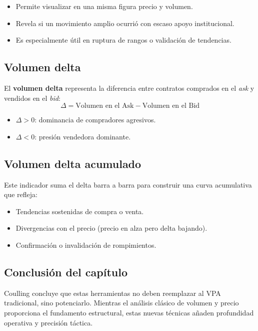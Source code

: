 \begin{itemize}
  \item Permite visualizar en una misma figura precio y volumen.
  \item Revela si un movimiento amplio ocurri\'o con escaso apoyo institucional.
  \item Es especialmente \'util en ruptura de rangos o validaci\'on de tendencias.
\end{itemize}

\subsection{Volumen delta}

El \textbf{volumen delta} representa la diferencia entre contratos comprados en el \textit{ask} y vendidos en el \textit{bid}:
\[ \Delta = \text{Volumen en el Ask} - \text{Volumen en el Bid} \]

\begin{itemize}
  \item $\Delta > 0$: dominancia de compradores agresivos.
  \item $\Delta < 0$: presi\'on vendedora dominante.
\end{itemize}

\subsection{Volumen delta acumulado}

Este indicador suma el delta barra a barra para construir una curva acumulativa que refleja:
\begin{itemize}
  \item Tendencias sostenidas de compra o venta.
  \item Divergencias con el precio (precio en alza pero delta bajando).
  \item Confirmaci\'on o invalidaci\'on de rompimientos.
\end{itemize}

\subsection{Conclusi\'on del cap\'itulo}

Coulling concluye que estas herramientas no deben reemplazar al VPA tradicional, sino potenciarlo. Mientras el an\'alisis cl\'asico de volumen y precio proporciona el fundamento estructural, estas nuevas t\'ecnicas a\~naden profundidad operativa y precisi\'on t\'actica.

